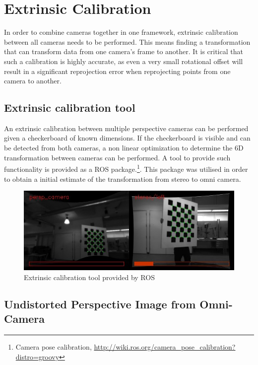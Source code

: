 \chapter{Extrinsic Calibration}
\label{chapter:extrinsic_calibration}

In order to combine cameras together in one framework, extrinsic calibration between all cameras needs to be performed.  This means finding a transformation that can transform data from one camera's frame to another.  It is critical that such a calibration is highly accurate, as even a very small rotational offset will result in a significant reprojection error when reprojecting points from one camera to another.

\section{Extrinsic calibration tool}
\label{sec:ros_tool}

An extrinsic calibration between multiple perspective cameras can be performed given a checkerboard of known dimensions.  If the checkerboard is visible and can be detected from both cameras, a non linear optimization to determine the 6D transformation between cameras can be performed.  A tool to provide such functionality is provided as a ROS package.\footnote{Camera pose calibration, \url{http://wiki.ros.org/camera_pose_calibration?distro=groovy}}.  This package was utilised in order to obtain a initial estimate of the transformation from stereo to omni camera.

\begin{figure}[h!]
  \centering
    \includegraphics[width=1.0\textwidth]{chapters/images/extrinsic_cal_1}
  \caption{Extrinsic calibration tool provided by ROS}
  \label{fig:extrinsic_cal_1}
\end{figure}

\section{Undistorted Perspective Image from Omni-Camera}
\label{sec:perspective_from_donut}

